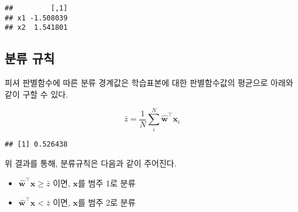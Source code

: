 \documentclass[]{book}
\newenvironment{Shaded}{\begin{snugshade}}{\end{snugshade}}
\newcommand{\KeywordTok}[1]{\textcolor[rgb]{0.13,0.29,0.53}{\textbf{#1}}}
\newcommand{\NormalTok}[1]{#1}
\newcommand{\OperatorTok}[1]{\textcolor[rgb]{0.81,0.36,0.00}{\textbf{#1}}}
\newcommand{\StringTok}[1]{\textcolor[rgb]{0.31,0.60,0.02}{#1}}
\providecommand{\tightlist}{%
  \setlength{\itemsep}{0pt}\setlength{\parskip}{0pt}}
\begin{document}
\begin{verbatim}
##         [,1]
## x1 -1.508039
## x2  1.541801
\end{verbatim}

\hypertarget{-}{%
\subsection{분류 규칙}\label{-}}

피셔 판별함수에 따른 분류 경계값은 학습표본에 대한 판별함수값의 평균으로 아래와 같이 구할 수 있다.

\begin{equation*}
\bar{z} = \frac{1}{N} \sum_i^N \hat{\mathbf{w}}^\top \mathbf{x}_i
\end{equation*}

\begin{Shaded}
\end{Shaded}

\begin{verbatim}
## [1] 0.526438
\end{verbatim}

위 결과를 통해, 분류규칙은 다음과 같이 주어진다.

\begin{itemize}
\tightlist
\item
  \(\hat{\mathbf{w}}^\top \mathbf{x} \ge \bar{z}\) 이면, \(\mathbf{x}\)를 범주 1로 분류
\item
  \(\hat{\mathbf{w}}^\top \mathbf{x} < \bar{z}\) 이면, \(\mathbf{x}\)를 범주 2로 분류
\end{itemize}
\end{document}
